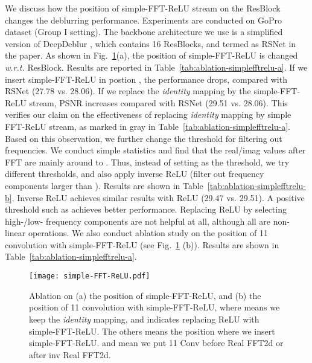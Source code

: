 \documentclass[letterpaper]{article} \usepackage{aaai23}  \usepackage{times}  \usepackage{helvet}  \usepackage{courier}  \usepackage[hyphens]{url}  \usepackage{graphicx} \usepackage{enumitem}
\begin{document}
We discuss how the position of simple-FFT-ReLU stream on the ResBlock changes the deblurring performance. Experiments are conducted on GoPro dataset (Group I setting). The backbone architecture we use is a simplified version of DeepDeblur \cite{Nah2017deep}, which contains 16 ResBlocks, and termed as RSNet in the paper. As shown in Fig.~\ref{fig:simple-fft-relu}(a), the position of simple-FFT-ReLU is changed \emph{w.r.t.} ResBlock. Results are reported in Table~\ref{tab:ablation-simplefftrelu-a}. If we insert simple-FFT-ReLU in postion , the performance drops, compared with RSNet (27.78 vs. 28.06). If we replace the \textit{identity} mapping by the simple-FFT-ReLU stream, PSNR increases compared with RSNet (29.51 vs. 28.06). This verifies our claim on the effectiveness of replacing \emph{identity} mapping by simple FFT-ReLU stream, as marked in \colorbox{gray!20}{gray} in Table~\ref{tab:ablation-simplefftrelu-a}. Based on this observation, we further change the threshold for filtering out frequencies. We conduct simple statistics and find that the real/imag values after FFT are mainly around  to . Thus, instead of setting  as the threshold, we try different thresholds, and also apply inverse ReLU (filter out frequency components larger than ). Results are shown in Table~\ref{tab:ablation-simplefftrelu-b}. Inverse ReLU achieves similar results with ReLU (29.47 vs. 29.51). A positive threshold such as  achieves better performance. Replacing ReLU by selecting high-/low- frequency components are not helpful at all, although all are non-linear operations.
We also conduct ablation study on the position of 11 convolution with simple-FFT-ReLU (see Fig.~\ref{fig:simple-fft-relu} (b)). Results are shown in Table~\ref{tab:ablation-simplefftrelu-a}. 

\begin{figure}[t]
\begin{center}
    \texttt{[image: simple-FFT-ReLU.pdf]}
\end{center}
\caption{Ablation on (a) the position of simple-FFT-ReLU, and (b) the position of 11 convolution with simple-FFT-ReLU, where  means we keep the \textit{identity} mapping, and  indicates replacing ReLU with simple-FFT-ReLU. The others means the position where we insert simple-FFT-ReLU.  and  mean we put 11 Conv before Real FFT2d or after inv Real FFT2d.} 
\label{fig:simple-fft-relu}
\end{figure}
\end{document}
